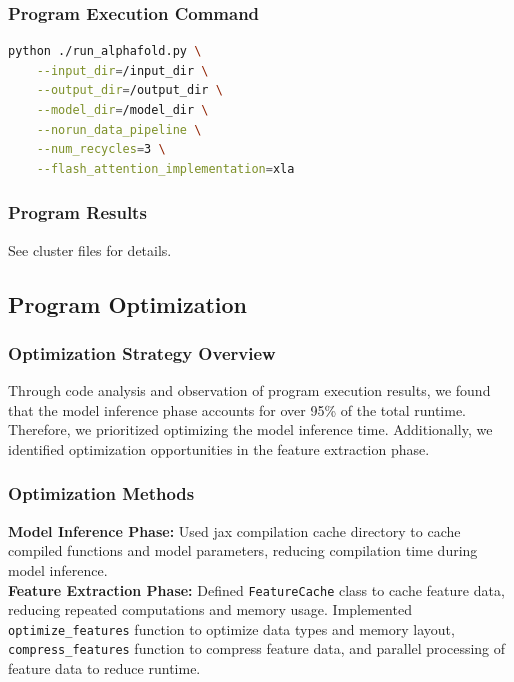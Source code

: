 \documentclass[a4paper,12pt]{article}
\begin{document}
\subsubsection{Program Execution Command}
\begin{lstlisting}[language=bash]
python ./run_alphafold.py \
    --input_dir=/input_dir \
    --output_dir=/output_dir \
    --model_dir=/model_dir \
    --norun_data_pipeline \
    --num_recycles=3 \
    --flash_attention_implementation=xla
\end{lstlisting}

\subsubsection{Program Results}
See cluster files for details.

\subsection{Program Optimization}

\subsubsection{Optimization Strategy Overview}
Through code analysis and observation of program execution results, we found that the model inference phase accounts for over 95\% of the total runtime. Therefore, we prioritized optimizing the model inference time. Additionally, we identified optimization opportunities in the feature extraction phase.

\subsubsection{Optimization Methods}
\textbf{Model Inference Phase:} Used jax compilation cache directory to cache compiled functions and model parameters, reducing compilation time during model inference. \\
\textbf{Feature Extraction Phase:} Defined \texttt{FeatureCache} class to cache feature data, reducing repeated computations and memory usage. Implemented \texttt{optimize\_features} function to optimize data types and memory layout, \texttt{compress\_features} function to compress feature data, and parallel processing of feature data to reduce runtime.
\end{document}
